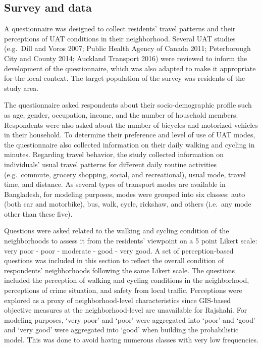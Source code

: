 \documentclass[]{elsarticle} %
\begin{document}
\hypertarget{survey-and-data}{%
\subsection{Survey and data}\label{survey-and-data}}

A questionnaire was designed to collect residents' travel patterns and
their perceptions of UAT conditions in their neighborhood. Several UAT
studies (e.g.~Dill and Voros 2007; Public Health Agency of Canada 2011;
Peterborough City and County 2014; Auckland Transport 2016) were
reviewed to inform the development of the questionnaire, which was also
adapted to make it appropriate for the local context. The target
population of the survey was residents of the study area.

The questionnaire asked respondents about their socio-demographic
profile such as age, gender, occupation, income, and the number of
household members. Respondents were also asked about the number of
bicycles and motorized vehicles in their household. To determine their
preference and level of use of UAT modes, the questionnaire also
collected information on their daily walking and cycling in minutes.
Regarding travel behavior, the study collected information on
individuals' usual travel patterns for different daily routine
activities (e.g.~commute, grocery shopping, social, and recreational),
usual mode, travel time, and distance. As several types of transport
modes are available in Bangladesh, for modeling purposes, modes were
grouped into six classes: auto (both car and motorbike), bus, walk,
cycle, rickshaw, and others (i.e.~any mode other than these five).

Questions were asked related to the walking and cycling condition of the
neighborhoods to assess it from the residents' viewpoint on a 5 point
Likert scale: very poor - poor - moderate - good - very good. A set of
perception-based questions was included in this section to reflect the
overall condition of respondents' neighborhoods following the same
Likert scale. The questions included the perception of walking and
cycling conditions in the neighborhood, perceptions of crime situation,
and safety from local traffic. Perceptions were explored as a proxy of
neighborhood-level characteristics since GIS-based objective measures at
the neighborhood-level are unavailable for Rajshahi. For modeling
purposes, `very poor' and `poor' were aggregated into `poor' and `good'
and `very good' were aggregated into `good' when building the
probabilistic model. This was done to avoid having numerous classes with
very low frequencies.
\end{document}
